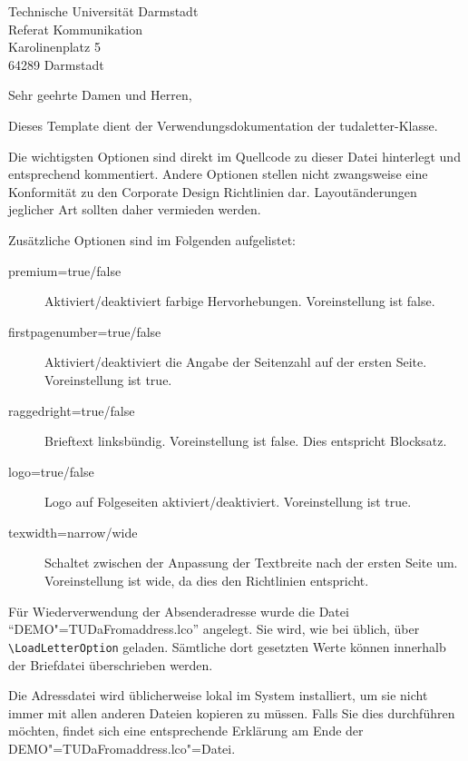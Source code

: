 \documentclass[
	ngerman,
	accentcolor=9c,%
	premium=true,%
]{tudaletter}
\begin{document}
\begin{letter}{%
    Technische Universität Darmstadt\\%
    Referat Kommunikation\\%
    Karolinenplatz 5\\%
    64289 Darmstadt}


\opening{Sehr geehrte Damen und Herren,}
Dieses Template dient der Verwendungsdokumentation der tudaletter-Klasse.

Die wichtigsten Optionen sind direkt im Quellcode zu dieser Datei hinterlegt und entsprechend kommentiert. Andere Optionen stellen nicht zwangsweise eine Konformität zu den Corporate Design Richtlinien dar. Layoutänderungen jeglicher Art sollten daher vermieden werden.

Zusätzliche Optionen sind im Folgenden aufgelistet:\\
\parbox{\linewidth}{
\begin{description}
	\item[premium=true/false] Aktiviert/deaktiviert farbige Hervorhebungen. Voreinstellung ist false.
	\item[firstpagenumber=true/false] Aktiviert/deaktiviert die Angabe der Seitenzahl auf der ersten Seite. Voreinstellung ist true.
	\item[raggedright=true/false] Brieftext linksbündig. Voreinstellung ist false. Dies entspricht Blocksatz.
	\item[logo=true/false] Logo auf Folgeseiten aktiviert/deaktiviert. Voreinstellung ist true.
	\item[texwidth=narrow/wide] Schaltet zwischen der Anpassung der Textbreite nach der ersten Seite um. Voreinstellung ist wide, da dies den Richtlinien entspricht.
\end{description}
}

Für Wiederverwendung der Absenderadresse wurde die Datei \enquote{DEMO"=TUDaFromaddress.lco} angelegt. Sie wird, wie bei \KOMAScript{} üblich, über 
\verb+\LoadLetterOption+ geladen. Sämtliche dort gesetzten Werte können innerhalb der Briefdatei überschrieben werden.

Die Adressdatei wird üblicherweise lokal im System installiert, um sie nicht immer mit allen anderen Dateien kopieren zu müssen. Falls Sie dies durchführen möchten, findet sich eine entsprechende Erklärung am Ende der DEMO"=TUDaFromaddress.lco"=Datei.


\end{letter}
\end{document}
